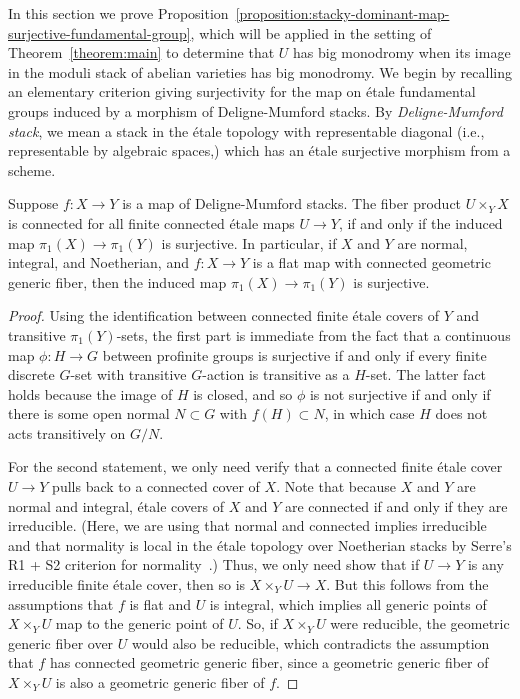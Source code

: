 In this section we prove Proposition~\ref{proposition:stacky-dominant-map-surjective-fundamental-group}, which will be applied
in the setting of Theorem~\ref{theorem:main} to determine
that $U$ has big monodromy when its image in the moduli stack of
abelian varieties has big monodromy. We begin by recalling an elementary criterion giving surjectivity for the map on \'{e}tale fundamental groups induced by a morphism of Deligne-Mumford stacks. By {\em Deligne-Mumford stack}, we mean a stack in the \'etale topology with representable diagonal (i.e., representable by algebraic spaces,)
which has an \'etale surjective morphism from a scheme.
\begin{lemma}
       \label{lemma:surjectivity-criterion-pi1}
       Suppose $f\colon X \rightarrow Y$ is a map of Deligne-Mumford stacks.
       The fiber product $U \times_Y X$ is connected
       for all finite connected \'etale maps $U \rightarrow Y$,
       if and only if
       the induced map $\pi_1(X) \rightarrow \pi_1(Y)$ is surjective.
       In particular, if $X$ and $Y$ are normal, integral, and Noetherian, and $f: X \rightarrow Y$ is a flat map with connected geometric
       generic fiber, then the induced map $\pi_1(X) \rightarrow \pi_1(Y)$ is surjective.
\end{lemma}
\begin{proof}
Using the identification between connected finite \'etale covers of $Y$ and transitive $\pi_1(Y)$-sets, the first part is immediate from the fact that a continuous map $\phi \colon H \rightarrow G$ between profinite groups is surjective if and only if every finite discrete $G$-set with transitive $G$-action is transitive as a $H$-set.
The latter fact holds because the image of $H$ is closed, and so $\phi$ is not surjective if and only if there is some open normal
$N \subset G$ with $f(H) \subset N$, in which case $H$ does not acts transitively on $G/N$.

For the second statement,
we only need verify that a connected finite \'etale cover $U \rightarrow Y$ pulls back to a connected cover of $X$.
Note that because $X$ and $Y$ are normal and integral, \'etale covers of $X$ and $Y$ are connected if and only if they are irreducible. (Here, we are using that
normal and connected implies irreducible and that
normality is local in the \'etale topology over Noetherian stacks by Serre's R1 + S2 criterion for normality~\cite[\href{http://stacks.math.columbia.edu/tag/031S}{Tag 031S}]{stacks-project}.)
Thus, we only need show that if $U \rightarrow Y$ is any irreducible finite \'etale cover, then so is $X \times_Y U \rightarrow X$.
But this follows from the assumptions that $f$ is flat and $U$ is integral,
which implies all generic points of $X \times_Y U$ map to the generic point of $U$.
So, if $X \times_Y U$ were reducible, the geometric generic fiber over $U$ would also be
reducible, which contradicts the assumption that $f$ has connected geometric generic fiber, since a geometric generic fiber of
$X \times_Y U$ is also a geometric generic fiber of $f$.
\end{proof}

